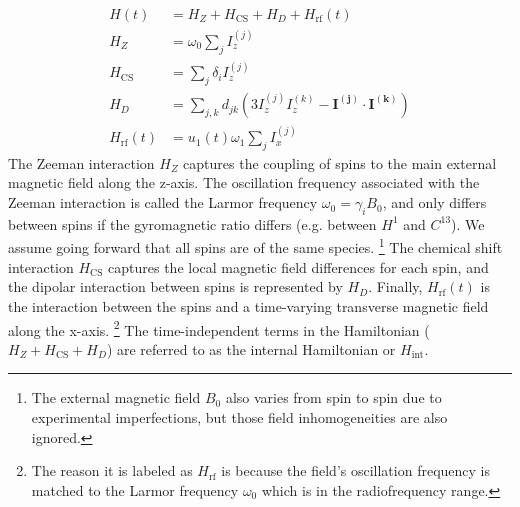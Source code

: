 \begin{align}\label{eq:nmr-ham}
    H(t) &= H_Z + H_\text{CS} + H_D + H_\text{rf}(t) \\
    H_Z &= \omega_0 \sum_j I_z^{(j)} \\
    H_\text{CS} &= \sum_j \delta_i I_z^{(j)} \\
    H_D &= \sum_{j,k} d_{jk} \left( 3I_z^{(j)}I_z^{(k)} - \mathbf{I^{(j)}} \cdot \mathbf{I^{(k)}} \right) \\
    \label{eq:nmr-ham-rf}
    H_{\text{rf}}(t) &=  u_1(t) \omega_1 \sum_j I_x^{(j)}
\end{align}
The Zeeman interaction $H_Z$ captures the coupling of spins to the main external magnetic field along the z-axis. The oscillation frequency associated with the Zeeman interaction is called the Larmor frequency $\omega_0 = \gamma_i B_0$, and only differs between spins if the gyromagnetic ratio differs (e.g. between $H^1$ and $C^{13}$). We assume going forward that all spins are of the same species.%
\footnote{The external magnetic field $B_0$ also varies from spin to spin due to experimental imperfections, but those field inhomogeneities are also ignored.}
The chemical shift interaction $H_{\text{CS}}$ captures the local magnetic field differences for each spin, and the dipolar interaction between spins is represented by $H_D$. Finally, $H_\text{rf}(t)$ is the interaction between the spins and a time-varying transverse magnetic field along the x-axis.%
\footnote{The reason it is labeled as $H_\text{rf}$ is because the field's oscillation frequency is matched to the Larmor frequency $\omega_0$ which is in the radiofrequency range.}
The time-independent terms in the Hamiltonian ($H_Z + H_{\text{CS}} + H_D$) are referred to as the internal Hamiltonian or $H_{\text{int}}$.


